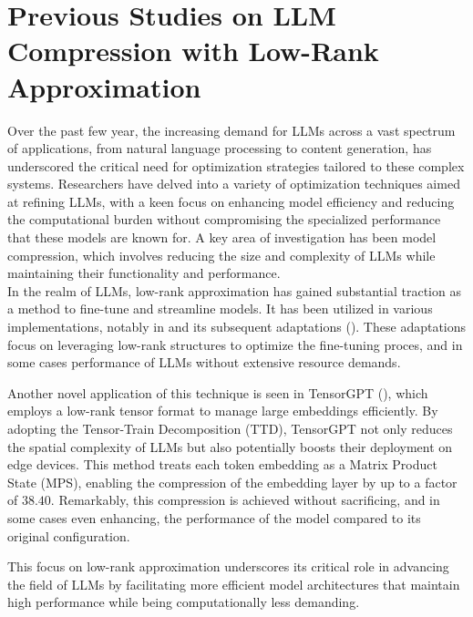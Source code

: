 \section{Previous Studies on LLM Compression with Low-Rank Approximation}
    Over the past few year, the increasing demand for LLMs across a vast spectrum of applications, from natural language processing to content generation, has underscored the critical need for optimization strategies tailored to these complex systems. Researchers have delved into a variety of optimization techniques aimed at refining LLMs, with a keen focus on enhancing model efficiency and reducing the computational burden without compromising the specialized performance that these models are known for.
    A key area of investigation has been model compression, which involves reducing the size and complexity of LLMs while maintaining their functionality and performance. \\

        In the realm of LLMs, low-rank approximation has gained substantial traction as a method to fine-tune and streamline models. It has been utilized in various implementations, notably in \cite{hu2021lora} and its subsequent adaptations (\cite{valipour-etal-2023-dylora, zhang2023adaptive, chavan2024oneforall}). These adaptations focus on leveraging low-rank structures to optimize the fine-tuning proces, and in some cases performance of LLMs without extensive resource demands.
        
        Another novel application of this technique is seen in TensorGPT (\cite{xu2023tensorgpt}), which employs a low-rank tensor format to manage large embeddings efficiently. By adopting the Tensor-Train Decomposition (TTD), TensorGPT not only reduces the spatial complexity of LLMs but also potentially boosts their deployment on edge devices. This method treats each token embedding as a Matrix Product State (MPS), enabling the compression of the embedding layer by up to a factor of \(38.40\). Remarkably, this compression is achieved without sacrificing, and in some cases even enhancing, the performance of the model compared to its original configuration.
        
        This focus on low-rank approximation underscores its critical role in advancing the field of LLMs by facilitating more efficient model architectures that maintain high performance while being computationally less demanding.


